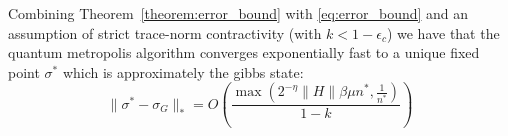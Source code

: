 \documentclass[aps,floatfix,10pt,amssymb,amsfont,amsmath,superscriptaddress,float,nofootinbib,longbibliography,nobalancelastpage,twocolumn]{revtex4-2}
\begin{document}
Combining Theorem~\ref{theorem:error_bound} with \eqref{eq:error_bound} and an assumption of strict trace-norm contractivity (with $k < 1-\epsilon_c$) we have that the quantum metropolis algorithm converges exponentially fast to a unique fixed point $\sigma^*$ which is approximately the gibbs state:
\begin{equation}
    \|\sigma^*-\sigma_G\|_* = 
    O\left(\frac{\max\left( 2^{-\eta}\|H\|\beta\mu  n^*,\frac{1}{n^*}\right)}{1-k}\right)
\end{equation}


\end{document}

